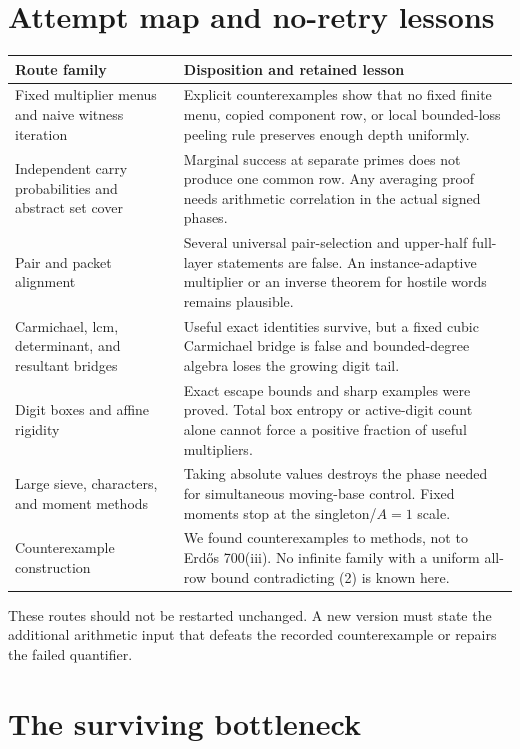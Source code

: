 \documentclass[11pt]{article}
\begin{document}
\section{Attempt map and no-retry lessons}

\begin{center}
\small
\begin{tabularx}{\textwidth}{@{}>{\raggedright\arraybackslash}p{}Y@{}}
\toprule
Route family & Disposition and retained lesson \\
\midrule
Fixed multiplier menus and naive witness iteration & Explicit counterexamples show that no fixed finite menu, copied component row, or local bounded-loss peeling rule preserves enough depth uniformly. \\
Independent carry probabilities and abstract set cover & Marginal success at separate primes does not produce one common row.  Any averaging proof needs arithmetic correlation in the actual signed phases. \\
Pair and packet alignment & Several universal pair-selection and upper-half full-layer statements are false.  An instance-adaptive multiplier or an inverse theorem for hostile words remains plausible. \\
Carmichael, lcm, determinant, and resultant bridges & Useful exact identities survive, but a fixed cubic Carmichael bridge is false and bounded-degree algebra loses the growing digit tail. \\
Digit boxes and affine rigidity & Exact escape bounds and sharp examples were proved.  Total box entropy or active-digit count alone cannot force a positive fraction of useful multipliers. \\
Large sieve, characters, and moment methods & Taking absolute values destroys the phase needed for simultaneous moving-base control.  Fixed moments stop at the singleton/$A=1$ scale. \\
Counterexample construction & We found counterexamples to methods, not to Erd\H{o}s 700(iii).  No infinite family with a uniform all-row bound contradicting (2) is known here. \\
\bottomrule
\end{tabularx}
\end{center}

These routes should not be restarted unchanged.  A new version must state
the additional arithmetic input that defeats the recorded counterexample or
repairs the failed quantifier.

\section{The surviving bottleneck}
\end{document}
